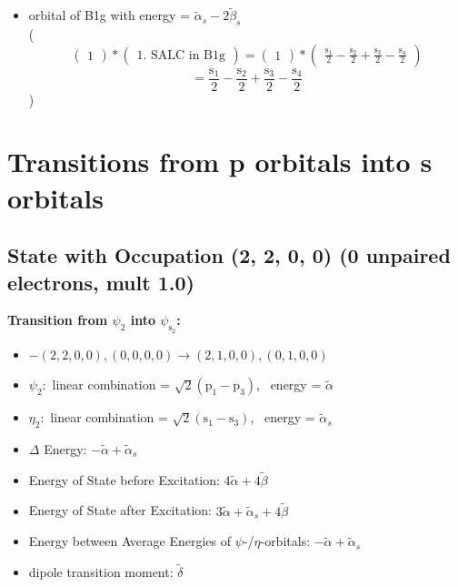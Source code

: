 \documentclass[12pt,a4paper]{article}
\begin{document}
\begin{itemize}
\item orbital of B1g with energy = 
                                $\tilde{\alpha}_{s} - 2 \tilde{\beta}_{s}$ \\
( 
$$
\begin{pmatrix}1\end{pmatrix} * \left(\begin{array}{c}\text{1. SALC in B1g}\end{array}\right) = \begin{pmatrix}1\end{pmatrix} * \begin{pmatrix}\frac{\text{s}_{1}}{2} - \frac{\text{s}_{2}}{2} + \frac{\text{s}_{3}}{2} - \frac{\text{s}_{4}}{2}\end{pmatrix} 
 $$ $$ = \frac{\text{s}_{1}}{2} - \frac{\text{s}_{2}}{2} + \frac{\text{s}_{3}}{2} - \frac{\text{s}_{4}}{2} 
 $$ 
 )

\end{itemize}



\newpage \section*{Transitions from p orbitals into s orbitals}\subsection*{State with Occupation (2, 2, 0, 0) (0 unpaired electrons, mult 1.0)}
        \noindent\textbf{Transition from $\psi_{2}$ into $\psi_{\text{s}_{2}}$:}
        \begin{itemize}
            \item $- (2, 2, 0, 0), (0, 0, 0, 0) \rightarrow (2, 1, 0, 0), (0, 1, 0, 0)$
        
            \item $\psi_{2}:$ linear combination = $\sqrt{2} \left(\text{p}_{1} - \text{p}_{3}\right)$, \
            energy = $\tilde{\alpha}$
            
            \item $\eta_{2}:$ linear combination = $\sqrt{2} \left(\text{s}_{1} - \text{s}_{3}\right)$, \
            energy = $\tilde{\alpha}_{s}$
            
                \item $\Delta$ Energy: $- \tilde{\alpha} + \tilde{\alpha}_{s}$
                \item Energy of State before Excitation: $4 \tilde{\alpha} + 4 \tilde{\beta}$
                \item Energy of State after Excitation: $3 \tilde{\alpha} + \tilde{\alpha}_{s} + 4 \tilde{\beta}$
                \item Energy between Average Energies of $\psi$-/$\eta$-orbitals: $- \tilde{\alpha} + \tilde{\alpha}_{s}$
            
            \item dipole transition moment: $\tilde{\delta}$
        
        \end{itemize}
        
\end{document}
